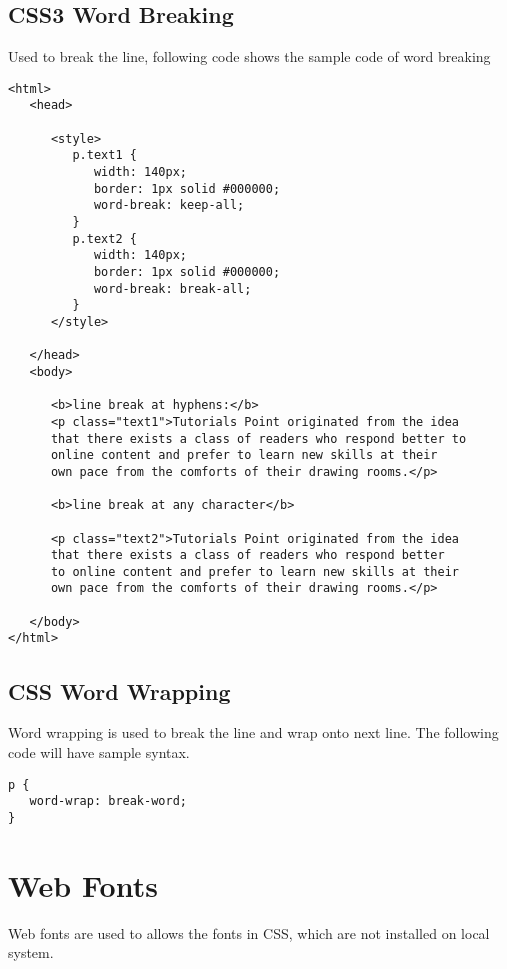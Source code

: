 \documentclass[a4paper,oneside]{book}
\numberwithin{equation}{chapter}
\begin{document}
\subsection{CSS3 Word Breaking}
Used to break the line, following code shows the sample code of word breaking
\begin{verbatim}
<html>
   <head>
   
      <style>
         p.text1 {
            width: 140px; 
            border: 1px solid #000000;
            word-break: keep-all;
         }
         p.text2 {
            width: 140px; 
            border: 1px solid #000000;
            word-break: break-all;
         }
      </style>
      
   </head>
   <body>
   
      <b>line break at hyphens:</b>
      <p class="text1">Tutorials Point originated from the idea 
      that there exists a class of readers who respond better to 
      online content and prefer to learn new skills at their 
      own pace from the comforts of their drawing rooms.</p>
      
      <b>line break at any character</b>
   
      <p class="text2">Tutorials Point originated from the idea 
      that there exists a class of readers who respond better 
      to online content and prefer to learn new skills at their
      own pace from the comforts of their drawing rooms.</p>
      
   </body>
</html>
\end{verbatim}
\subsection{CSS Word Wrapping}
Word wrapping is used to break the line and wrap onto next line. The following code will have sample syntax.
\begin{verbatim}
p {
   word-wrap: break-word;
}
\end{verbatim}
\section{Web Fonts}
Web fonts are used to allows the fonts in CSS, which are not installed on local system.
\end{document}
